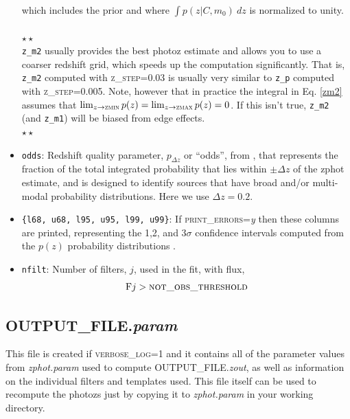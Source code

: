 \documentclass[11pt]{article}
\begin{document}
\begin{itemize}
\noindent which includes the prior and where $\int p(z|C,m_0)\ dz$ is normalized to unity.\\
\ \\
$\star\star$\\
 \texttt{z\_m2} usually provides the best photoz estimate
 and allows you to use a coarser redshift grid, which speeds
 up the computation significantly.  That is, \texttt{z\_m2}
 computed with \textsc{z\_step=0.03} is usually very similar
 to \texttt{z\_p} computed with \textsc{z\_step=0.005}. 
 Note, however that in practice the integral in Eq.
 \ref{zm2} assumes that $\lim_{z\to{\textsc{zmin}}}
 p(z)=\lim_{z\to{\textsc{zmax}}} p(z)=0$.  If this isn't
 true, \texttt{z\_m2} (and \texttt{z\_m1}) will be biased
 from edge effects.\\
$\star\star$

\item \texttt{odds}:  Redshift quality parameter, $p_{\Delta
z}$ or ``odds'', from \cite{bpz}, that represents the
fraction of the total integrated probability that lies
within $\pm \Delta z$ of the zphot estimate, and is designed
to identify sources that have broad and/or multi-modal
probability distributions.  Here we use $\Delta z=0.2$.

\item \texttt{\{l68, u68, l95, u95, l99, u99\}}: If
\textsc{print\_errors}=\textsl{y} then these columns are printed, representing
the 1,2, and 3$\sigma$ confidence intervals computed from the $p(z)$ probability
distributions \citep[\S2.5, ][]{eazy_paper}.

\item \texttt{nfilt}: Number of filters, $j$, used in the fit, with flux, 
\begin{equation} \mathrm{F}j > \textsc{not\_obs\_threshold}
\end{equation}


\end{itemize}


    \subsection{\textrm{OUTPUT\_FILE.}\textit{param}}

	This file is created if \textsc{verbose\_log=1} and it
	contains all of the parameter values from
	\textit{zphot.param} used to compute
	\textrm{OUTPUT\_FILE.}\textit{zout}, as well as
	information on the individual filters and templates
	used.  This file itself can be used to recompute the
	photozs just by copying it to \textit{zphot.param} in
	your working directory.
    
\end{document}
